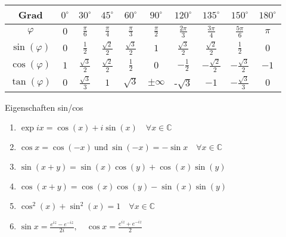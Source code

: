 \begin{center}
    \renewcommand{\arraystretch}{1.3} %
    \setlength{\tabcolsep}{4pt}
    \begin{tabular}{|c|c|c|c|c|c|c|c|c|c|}
        \hline
        Grad            & $0^\circ$ & $30^\circ$           & $45^\circ$           & $60^\circ$           & $90^\circ$      & $120^\circ$          & $135^\circ$           & $150^\circ$           & $180^\circ$ \\
        \hline
        $\varphi$       & $0$       & $\frac{\pi}{6}$      & $\frac{\pi}{4}$      & $\frac{\pi}{3}$      & $\frac{\pi}{2}$ & $\frac{2\pi}{3}$     & $\frac{3\pi}{4}$      & $\frac{5\pi}{6}$      & $\pi$       \\
        \hline
        $\sin(\varphi)$ & $0$       & $\frac{1}{2}$        & $\frac{\sqrt{2}}{2}$ & $\frac{\sqrt{3}}{2}$ & $1$             & $\frac{\sqrt{3}}{2}$ & $\frac{\sqrt{2}}{2}$  & $\frac{1}{2}$         & $0$         \\
        \hline
        $\cos(\varphi)$ & $1$       & $\frac{\sqrt{3}}{2}$ & $\frac{\sqrt{2}}{2}$ & $\frac{1}{2}$        & $0$             & $-\frac{1}{2}$       & $-\frac{\sqrt{2}}{2}$ & $-\frac{\sqrt{3}}{2}$ & $-1$        \\
        \hline
        $\tan(\varphi)$ & $0$       & $\frac{\sqrt{3}}{3}$ & $1$                  & $\sqrt{3}$           & $\pm \infty$    & -$\sqrt{3}$          & $-1$                  & $-\frac{\sqrt{3}}{3}$ & $0$         \\
        \hline
    \end{tabular}
\end{center}





\begin{theorem}{Eigenschaften sin/cos}
    \begin{enumerate}
        \item $\exp ix = \cos(x) + i \sin(x) \quad \forall x \in \mathbb{C}$
        \item $\cos x = \cos(-x) ~\text{und}~ \sin(-x) = -\sin x \quad\forall x \in \mathbb{C}$
        \item $\sin(x + y) = \sin(x)\cos(y) + \cos(x)\sin(y)$
        \item $\cos(x + y) = \cos(x)\cos(y) - \sin(x)\sin(y)$
        \item $\cos^2(x) + \sin^2(x) = 1 \quad \forall x \in \mathbb{C}$ 
        \item $\sin x = \frac{e^{iz} - e^{-iz}}{2i}, \quad \cos x = \frac{e^{iz} + e^{-iz}}{2}$
    \end{enumerate} 
 \end{theorem}
 

